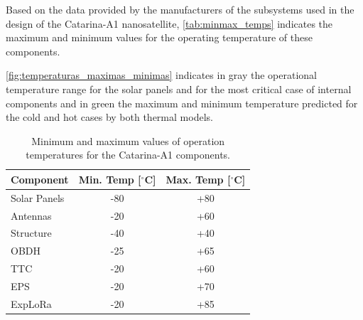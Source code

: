 

Based on the data provided by the manufacturers of the subsystems used in the design of the Catarina-A1 nanosatellite, \autoref{tab:minmax_temps} indicates the maximum and minimum values for the operating temperature of these components.

\autoref{fig:temperaturas_maximas_minimas} indicates in gray the operational temperature range for the solar panels and for the most critical case of internal components and in green the maximum and minimum temperature predicted for the cold and hot cases by both thermal models.

\begin{table}[!ht]
    \centering
    \footnotesize
    \begin{tabular}{lcc}
        \toprule[1.5pt]
        \textbf{Component} & \textbf{Min. Temp [$^\circ$C]} & \textbf{Max. Temp [$^\circ$C]} \\
        \midrule
        Solar Panels & -80 & +80 \\
        Antennas     & -20 & +60 \\
        Structure    & -40 & +40 \\
        \ac{OBDH}    & -25 & +65 \\
        \ac{TTC}     & -20 & +60 \\
        \ac{EPS}     & -20 & +70 \\
        ExpLoRa      & -20 & +85 \\
        \bottomrule[1.5pt]
    \end{tabular}
    \caption{Minimum and maximum values of operation temperatures for the Catarina-A1 components.}
    \label{tab:minmax_temps}
\end{table}

